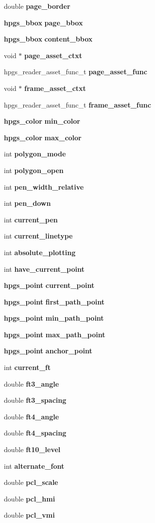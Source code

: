 \begin{DoxyCompactItemize}
double {\bf page\_\-border}
\item 
{\bf hpgs\_\-bbox} {\bf page\_\-bbox}
\item 
{\bf hpgs\_\-bbox} {\bf content\_\-bbox}
\item 
void $\ast$ {\bf page\_\-asset\_\-ctxt}
\item 
hpgs\_\-reader\_\-asset\_\-func\_\-t {\bf page\_\-asset\_\-func}
\item 
void $\ast$ {\bf frame\_\-asset\_\-ctxt}
\item 
hpgs\_\-reader\_\-asset\_\-func\_\-t {\bf frame\_\-asset\_\-func}
\item 
{\bf hpgs\_\-color} {\bf min\_\-color}
\item 
{\bf hpgs\_\-color} {\bf max\_\-color}
\item 
int {\bf polygon\_\-mode}
\item 
int {\bf polygon\_\-open}
\item 
int {\bf pen\_\-width\_\-relative}
\item 
int {\bf pen\_\-down}
\item 
int {\bf current\_\-pen}
\item 
int {\bf current\_\-linetype}
\item 
int {\bf absolute\_\-plotting}
\item 
int {\bf have\_\-current\_\-point}
\item 
{\bf hpgs\_\-point} {\bf current\_\-point}
\item 
{\bf hpgs\_\-point} {\bf first\_\-path\_\-point}
\item 
{\bf hpgs\_\-point} {\bf min\_\-path\_\-point}
\item 
{\bf hpgs\_\-point} {\bf max\_\-path\_\-point}
\item 
{\bf hpgs\_\-point} {\bf anchor\_\-point}
\item 
int {\bf current\_\-ft}
\item 
double {\bf ft3\_\-angle}
\item 
double {\bf ft3\_\-spacing}
\item 
double {\bf ft4\_\-angle}
\item 
double {\bf ft4\_\-spacing}
\item 
double {\bf ft10\_\-level}
\item 
int {\bf alternate\_\-font}
\item 
double {\bf pcl\_\-scale}
\item 
double {\bf pcl\_\-hmi}
\item 
double {\bf pcl\_\-vmi}
\item 

\end{DoxyCompactItemize}
